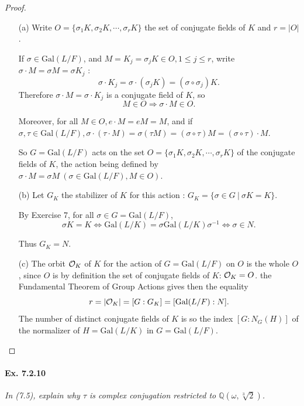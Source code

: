\documentclass[11pt,a4paper]{article}
\newcommand{\Q}{\mathbb{Q}}
\newcommand{\Gal}{\mathrm{Gal}}
\begin{document}
\begin{proof}
\begin{enumerate}
\item[(a)] 
Write $O = \{\sigma_1 K, \sigma_2 K,\cdots,\sigma_r K\}$ the set of conjugate fields of $K$ and  $r = \vert O \vert $.

If $\sigma \in \Gal(L/F)$, and $M = K_j = \sigma_j K \in O,1\leq j \leq r$, write $\sigma \cdot M = \sigma M = \sigma K_j$ : 
$$\sigma\cdot K_j = \sigma \cdot (\sigma_j K) = (\sigma \circ \sigma_j) K.$$
Therefore $\sigma \cdot M = \sigma\cdot K_j$ is a conjugate field of $K$, so 
$$M \in O \Rightarrow \sigma \cdot  M\in O.$$

Moreover, for all $M \in O , e \cdot M = e M = M$, and if $\sigma,\tau \in \Gal(L/F), \sigma \cdot (\tau \cdot M) = \sigma(\tau M) = (\sigma \circ \tau)M = (\sigma\circ \tau)\cdot M$.

So $G = \Gal(L/F)$ acts on the set $O =  \{\sigma_1 K, \sigma_2 K,\cdots,\sigma_r K\}$ of the conjugate fields of $K$, the action being defined by $\sigma \cdot M= \sigma M \ (\sigma \in \Gal(L/F), M \in O)$.

\item[(b)] Let $G_K$ the stabilizer of $K$ for this action : $G_K = \{\sigma \in G \ \vert \ \sigma K =K\}$.

By Exercise 7, for all $\sigma \in G = \Gal(L/F)$, 
$$\sigma K = K \iff \Gal(L/K) = \sigma \Gal(L/K) \sigma^{-1} \iff \sigma \in N.$$

Thus $G_K = N$.

\item[(c)]
The orbit ${\cal O}_K$ of $K$ for the action of $G = \Gal(L/F)$ on $O$ is  the whole $O$, since $O$ is by definition the set of conjugate fields of $K$: ${\cal O}_K = O$. the Fundamental Theorem of Group Actions gives then the equality
$$r = \vert {\cal O}_K \vert = [G : G_K] = [\Gal(L/F) : N].$$
The number of distinct conjugate fields of $K$ is so the index $[G : N_G(H)]$ of the normalizer of $H = \Gal(L/K)$ in $G= \Gal(L/F)$.

\end{enumerate}
\end{proof}

\paragraph{Ex. 7.2.10}

{\it In (7.5), explain why $\tau$ is complex conjugation restricted to $\Q(\omega,\sqrt[3]{2})$.
}
\end{document}
